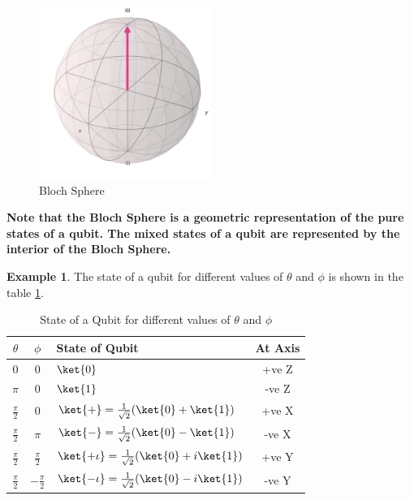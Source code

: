 \documentclass[12pt, oneside]{book}
\theoremstyle{definition}
\theoremstyle{definition}
\newtheorem{example}{Example}[section]
\theoremstyle{remark}
\begin{document}
\begin{figure}[H]
    \centering
    \includegraphics[width=0.5\textwidth]{../images/bloch_sphere.png}
    \caption{Bloch Sphere}
    \label{fig:bloch_sphere_code}
\end{figure}
\textbf{Note that the Bloch Sphere is a geometric representation of the pure states of a qubit. The mixed states of a qubit are represented by the interior of the Bloch Sphere.}

\begin{example}
    The state of a qubit for different values of $\theta$ and $\phi$ is shown in the table \ref{tab:bloch_sphere}.
    \begin{table}[H]
        \centering
        \begin{tabular}{|c|c|>{\centering\arraybackslash}m{8cm}|c|}
            \hline
            $\theta$ & $\phi$ & State of Qubit & At Axis\\
            \hline
            0 & 0 & $\ket{0}$ & +ve Z\\
            $\pi$ & 0 & $\ket{1}$ & -ve Z \\
            $\frac{\pi}{2}$ & 0 & $\ket{+} = \frac{1}{\sqrt{2}}(\ket{0} + \ket{1})$ & +ve X\\
            $\frac{\pi}{2}$ & $\pi$ & $\ket{-} = \frac{1}{\sqrt{2}}(\ket{0} - \ket{1})$ & -ve X\\
            $\frac{\pi}{2}$ & $\frac{\pi}{2}$ & $\ket{+\iota}=\frac{1}{\sqrt{2}}(\ket{0} + i\ket{1})$ & +ve Y \\
            $\frac{\pi}{2}$ & $-\frac{\pi}{2}$ & $\ket{-\iota}=\frac{1}{\sqrt{2}}(\ket{0} - i\ket{1})$ & -ve Y\\
            \hline
        \end{tabular}
        \caption{State of a Qubit for different values of $\theta$ and $\phi$}
        \label{tab:bloch_sphere}
    \end{table}
\end{example}
\end{document}
